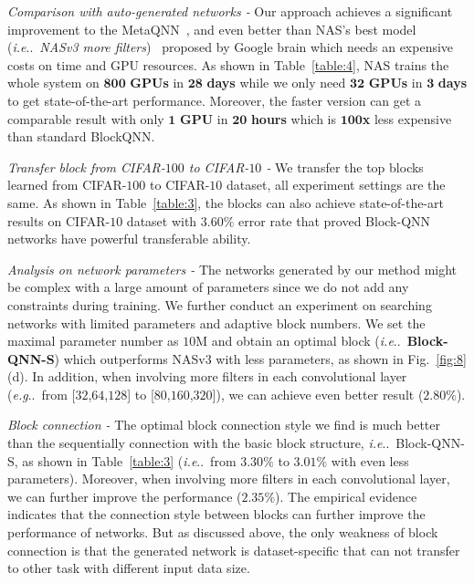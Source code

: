 \documentclass[10pt,journal,compsoc]{IEEEtran}
\makeatletter
\DeclareRobustCommand\onedot{\futurelet\@let@token\@onedot}
\def\@onedot{\ifx\@let@token.\else.\null\fi\xspace}
\def\eg{\emph{e.g}\onedot} \def\Eg{\emph{E.g}\onedot}
\def\ie{\emph{i.e}\onedot} \def\Ie{\emph{I.e}\onedot}
\makeatother
\begin{document}
\vspace{0.1cm} \noindent \textit{Comparison with auto-generated networks -}
Our approach achieves a significant improvement to the MetaQNN~\cite{baker2016designing}, and even better than NAS's best model (\ie~\textit{NASv3 more filters})~\cite{zoph2016neural} proposed by Google brain which needs an expensive costs on time and GPU resources. As shown in Table~\ref{table:4}, NAS trains the whole system on $\mathbf{800}$ \textbf{GPUs} in $\mathbf{28}$ \textbf{days} while we only need $\mathbf{32}$ \textbf{GPUs} in $\mathbf{3}$ \textbf{days} to get state-of-the-art performance. 
Moreover, the faster version can get a comparable result with only $\mathbf{1}$ \textbf{GPU} in $\mathbf{20}$ \textbf{hours} which is $\mathbf{100}$\textbf{x} less expensive than standard BlockQNN.


\vspace{0.1cm} \noindent \textit{Transfer block from CIFAR-$100$ to CIFAR-$10$ -}
We transfer the top blocks learned from CIFAR-$100$ to CIFAR-$10$ dataset, all experiment settings are the same. As shown in Table~\ref{table:3}, the blocks can also achieve state-of-the-art results on CIFAR-$10$ dataset with $3.60\%$ error rate that proved Block-QNN networks have powerful transferable ability.


\vspace{0.1cm} \noindent \textit{Analysis on network parameters -}
The networks generated by our method might be complex with a large amount of parameters since we do not add any constraints during training. We further conduct an experiment on searching networks with limited parameters and adaptive block numbers. We set the maximal parameter number as $10$M and obtain an optimal block (\ie~\textbf{Block-QNN-S}) which outperforms NASv3 with less parameters, as shown in Fig.~\ref{fig:8}(d). In addition, when involving more filters in each convolutional layer (\eg~from [$32$,$64$,$128$] to [$80$,$160$,$320$]), we can achieve even better result ($2.80\%$).

\vspace{0.1cm} \noindent \textit{Block connection -}
The optimal block connection style we find is much better than the sequentially connection with the basic block structure, \ie~Block-QNN-S, as shown in Table~\ref{table:3} (\ie~from $3.30\%$ to $3.01\%$ with even less parameters). Moreover, when involving more filters in each convolutional layer, we can further improve the performance ($2.35\%$). The empirical evidence indicates that the connection style between blocks can further improve the performance of networks. But as discussed above, the only weakness of block connection is that the generated network is dataset-specific that can not transfer to other task with different input data size.
\end{document}
